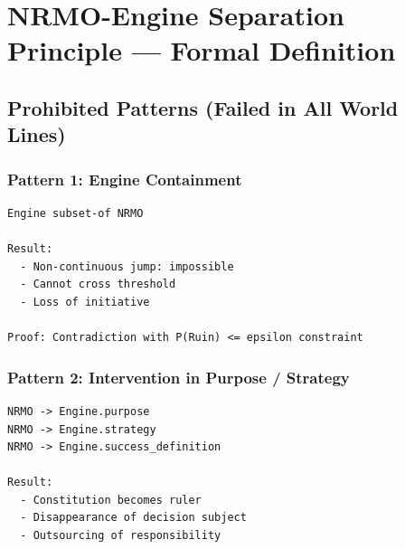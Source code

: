 
\chapter{NRMO-Engine Separation Principle ---
Formal Definition}
\label{ch:separation-principle}


\section{Prohibited Patterns (Failed in All World Lines)}
\label{sec:sep-prohibited}

\subsection{Pattern 1: Engine Containment}

\begin{lstlisting}[basicstyle=\ttfamily\small,frame=single]
Engine subset-of NRMO

Result:
  - Non-continuous jump: impossible
  - Cannot cross threshold
  - Loss of initiative

Proof: Contradiction with P(Ruin) <= epsilon constraint
\end{lstlisting}

\subsection{Pattern 2: Intervention in Purpose / Strategy}

\begin{lstlisting}[basicstyle=\ttfamily\small,frame=single]
NRMO -> Engine.purpose
NRMO -> Engine.strategy
NRMO -> Engine.success_definition

Result:
  - Constitution becomes ruler
  - Disappearance of decision subject
  - Outsourcing of responsibility
\end{lstlisting}

